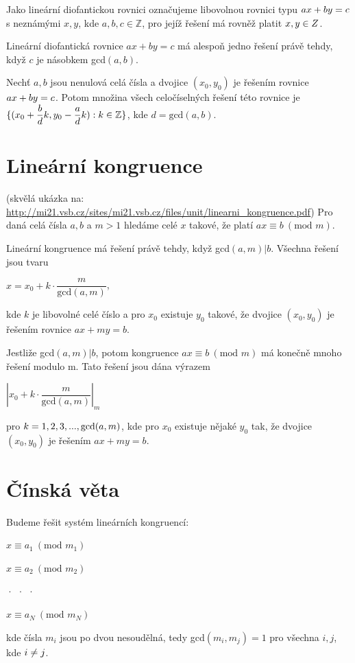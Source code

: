 \documentclass{szzclass}
\begin{document}
Jako lineární diofantickou rovnici označujeme libovolnou rovnici typu $ax +\nolinebreak by = c$
s neznámými $x, y$, kde $a, b, c \in \mathbb{Z}$, pro jejíž řešení má rovněž platit $x, y \in\nolinebreak Z$.

Lineární diofantická rovnice $ax + by = c$ má alespoň jedno řešení právě
tehdy, když $c$ je násobkem gcd$(a, b)$.

Nechť $a, b$ jsou nenulová celá čísla a dvojice $(x_0, y_0)$ je řešením rovnice
$ax +\nolinebreak by =\nolinebreak c$. Potom množina všech celočíselných řešení této rovnice je
$\{(x_0 +\dfrac{b}{d}k, y_0 -\dfrac{a}{d}k) :\nolinebreak k \in\nolinebreak \mathbb{Z}\}$, kde $d = \text{gcd}(a, b)$.


\section{Lineární kongruence}
(skvělá ukázka na: \url{http://mi21.vsb.cz/sites/mi21.vsb.cz/files/unit/linearni_kongruence.pdf})
Pro daná celá čísla $a, b$ a $m > 1$ hledáme
celé $x$ takové, že platí $ax \equiv b~(\text{mod } m)$.

Lineární kongruence má řešení právě tehdy, když gcd$(a, m)|b$. Všechna
řešení jsou tvaru 
\begin{center}
$x = x_0 + k ·\dfrac{m}{\text{gcd}(a, m)}$,
\end{center}
kde $k$ je libovolné celé číslo a pro $x_0$ existuje $y_0$ takové, že dvojice $(x_0, y_0)$
je řešením rovnice $ax + my = b$.


Jestliže gcd$(a, m)|b$, potom kongruence $ax \equiv b~(\text{mod } m)$ má konečně
mnoho řešení modulo m. Tato řešení jsou dána výrazem
\begin{center}
$|x_0 + k ·\dfrac{m}{\text{gcd}(a, m)}|_m$
\end{center}
pro $k =\nolinebreak 1, 2, 3, . . . , \text{gcd}(a, m)$, kde pro $x_0$ existuje nějaké $y_0$ tak, že dvojice
$(x_0, y_0)$ je řešením $ax + my = b$.

\newpage

\section{Čínská věta}

Budeme řešit systém lineárních kongruencí:
\begin{center}
$x \equiv a_1~(\text{mod } m_1)$

$x \equiv a_2~(\text{mod } m_2)$

· · ·

$x \equiv a_N~(\text{mod } m_N )$

\end{center}
kde čísla $m_i$ jsou po dvou nesoudělná, tedy gcd$(m_i, m_j ) = 1$ pro všechna $i, j$, kde $i \neq\nolinebreak j$.
\end{document}

